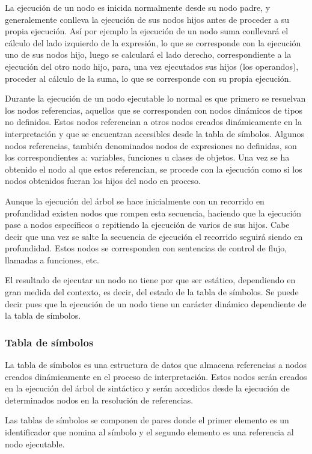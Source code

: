 La ejecución de un nodo es inicida normalmente desde su nodo padre, y generalemente conlleva la ejecución de sus nodos hijos antes de proceder a su propia ejecución. Así por ejemplo 
la ejecución de un nodo suma conllevará el cálculo del lado izquierdo de la expresión, lo que se corresponde con la ejecución uno de sus nodos hijo, luego se calculará
el lado derecho, correspondiente a la ejecución del otro nodo hijo, para, una vez ejecutados sus hijos (los operandos), proceder al cálculo de la suma, lo que se corresponde 
con su propia ejecución. 

Durante la ejecución de un nodo ejecutable lo normal es que primero se resuelvan los nodos referencias, aquellos que se corresponden con nodos dinámicos de tipos no definidos. Estos 
nodos referencian a otros nodos creados dinámicamente en la interpretación y que se encuentran accesibles desde la tabla de símbolos. Algunos nodos referencias, 
también denominados nodos de expresiones no definidas, son los correspondientes a: variables, funciones u clases de objetos. Una vez se ha obtenido el nodo al que estos referencian, 
se procede con la ejecución como si los nodos obtenidos fueran los hijos del nodo en proceso.

Aunque la ejecución del árbol se hace inicialmente con un recorrido en profundidad existen nodos que rompen esta secuencia, haciendo que la ejecución pase a nodos específicos 
o repitiendo la ejecución de varios de sus hijos. Cabe decir que una vez se salte la secuencia de ejecución el recorrido seguirá siendo en profundidad. Estos nodos 
se corresponden con sentencias de control de flujo, llamadas a funciones, etc.

El resultado de ejecutar un nodo no tiene por que ser estático, dependiendo en gran medida del contexto, es decir, del estado de la tabla de símbolos. Se puede decir pues que la 
ejecución de un nodo tiene un carácter dinámico dependiente de la tabla de símbolos.

\subsubsection{Tabla de símbolos}
La tabla de símbolos es una estructura de datos que almacena referencias a nodos creados dinámicamente en el proceso de interpretación. Estos nodos serán creados en la 
ejecución del árbol de sintáctico y serán accedidos desde la ejecución de determinados nodos en la resolución de referencias. 

Las tablas de símbolos se componen de pares donde el primer elemento es un identificador que nomina al símbolo y el segundo elemento es una referencia al nodo ejecutable. 

